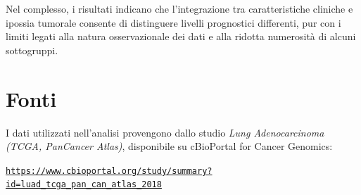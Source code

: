 \documentclass[12pt,a4paper]{article}
\begin{document}
Nel complesso, i risultati indicano che l'integrazione tra caratteristiche cliniche e ipossia tumorale consente di distinguere livelli prognostici differenti, pur con i limiti legati alla natura osservazionale dei dati e alla ridotta numerosità di alcuni sottogruppi.

\section{Fonti}

I dati utilizzati nell'analisi provengono dallo studio
\textit{Lung Adenocarcinoma (TCGA, PanCancer Atlas)}, disponibile su cBioPortal for Cancer Genomics:

\begin{center}
\href{https://www.cbioportal.org/study/summary?id=luad_tcga_pan_can_atlas_2018}
{\texttt{https://www.cbioportal.org/study/summary?id=luad\_tcga\_pan\_can\_atlas\_2018}}
\end{center}
\end{document}
